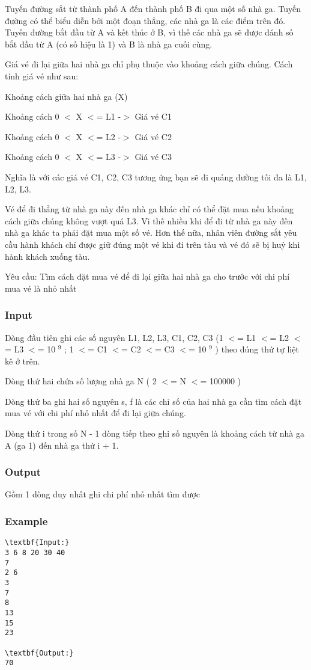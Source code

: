 



   Tuyến đường sắt từ thành phố A đến thành phố B đi qua một số nhà ga. Tuyến đường có thể biểu diễn bởi một đoạn thẳng, các nhà ga là các điểm trên đó. Tuyến đường bắt đầu từ A và kết thúc ở B, vì thế các nhà ga sẽ được đánh số bắt đầu từ A (có số hiệu là 1) và B là nhà ga cuối cùng.  

   Giá vé đi lại giữa hai nhà ga chỉ phụ thuộc vào khoảng cách giữa chúng. Cách tính giá vé như sau:  

   Khoảng cách giữa hai nhà ga (X)  

   Khoảng cách 0 $<$ X $<$= L1      -$>$ Giá vé              C1  

   Khoảng cách 0 $<$ X $<$= L2     -$>$ Giá vé              C2  

   Khoảng cách 0 $<$ X $<$= L3     -$>$ Giá vé              C3  

   Nghĩa là với các giá vé C1, C2, C3 tương ứng bạn sẽ đi quảng đường tối đa là L1, L2, L3.  

   Vé để đi thẳng từ nhà ga này đến nhà ga khác chỉ có thể đặt mua nếu khoảng cách giữa chúng không vượt quá L3. Vì thế nhiều khi để đi từ nhà ga này đến nhà ga khác ta phải đặt mua một số vé. Hơn thế nữa, nhân viên đường sắt yêu cầu hành khách chỉ được giữ đúng một vé khi đi trên tàu và vé đó sẽ bị huỷ khi hành khách xuống tàu.  

   Yêu cầu: Tìm cách đặt mua vé để đi lại giữa hai nhà ga cho trước với chi phí mua vé là nhỏ nhất  

\subsubsection{   Input  }

   Dòng đầu tiên ghi các số nguyên L1, L2, L3, C1, C2, C3 (1 $<$= L1 $<$= L2 $<$= L3 $<$= 10   $^    9   $   ;  1 $<$= C1 $<$= C2 $<$= C3 $<$= 10   $^    9   $   ) theo đúng thứ tự liệt kê ở trên.  

   Dòng thứ hai chứa số lượng nhà ga N ( 2 $<$= N $<$= 100000 )  

   Dòng thứ ba ghi hai số nguyên s, f là các chỉ số của hai nhà ga cần tìm cách đặt mua vé với chi phí nhỏ nhất để đi lại giữa chúng.  

   Dòng thứ i trong số N - 1 dòng tiếp theo ghi số nguyên là khoảng cách từ nhà ga A (ga 1) đến nhà ga thứ i + 1.  

\subsubsection{   Output  }

   Gồm 1 dòng duy nhất ghi chi phí nhỏ nhất tìm được  

\subsubsection{   Example  }
\begin{verbatim}
\textbf{Input:}
3 6 8 20 30 40
7
2 6
3
7
8
13
15
23

\textbf{Output:}
70
\end{verbatim}